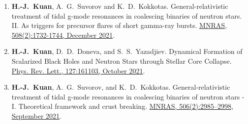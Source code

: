 \documentclass[10pt,floatfix,a4paper]{article}
\begin{document}
\begin{enumerate}
	\item  \textbf{H.-J.~Kuan}, A.~G.~Suvorov and K.~D.~Kokkotas. General-relativistic treatment of tidal g-mode resonances in coalescing binaries of neutron stars. II. As triggers for precursor flares of short gamma-ray bursts. \href{https://doi.org/10.1093/mnras/stab2658}{MNRAS, 508(2):1732-1744, December 2021}.
	\item \textbf{H.-J.~Kuan}, D.~D.~Doneva, and S.~S.~Yazadjiev. Dynamical Formation of Scalarized Black Holes and Neutron Stars through Stellar Core Collapse. \href{https://doi.org/10.1103/PhysRevLett.127.161103}{Phys. Rev. Lett., 127:161103, October 2021}.
	\item \textbf{H.-J.~Kuan}, A.~G.~Suvorov, and K.~D.~Kokkotas. General-relativistic treatment of tidal g-mode resonances in coalescing binaries of neutron stars - I. Theoretical framework and crust breaking. \href{https://doi.org/10.1093/mnras/stab1898}{MNRAS, 506(2):2985–2998, September 2021}.
\end{enumerate}
\end{document}
